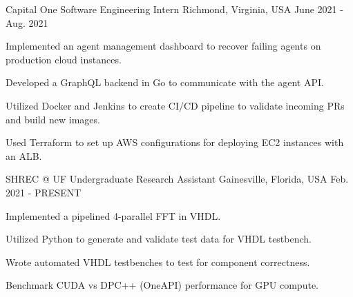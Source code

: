 
\begin{cventries}

  \cventry
    {Capital One} %
    {Software Engineering Intern} %
    {Richmond, Virginia, USA} %
    {June 2021 - Aug. 2021} %
    {
      \begin{cvitems} %
        \item {Implemented an agent management dashboard to recover failing agents on production cloud instances.}
        \item {Developed a GraphQL backend in Go to communicate with the agent API.}
        \item {Utilized Docker and Jenkins to create CI/CD pipeline to validate incoming PRs and build new images.}
        \item {Used Terraform to set up AWS configurations for deploying EC2 instances with an ALB.}
      \end{cvitems}
    }


\cventry
  {SHREC @ UF} %
  {Undergraduate Research Assistant} %
  {Gainesville, Florida, USA} %
  {Feb. 2021 - PRESENT} %
  {
    \begin{cvitems} %
      \item {Implemented a pipelined 4-parallel FFT in VHDL.}
      \item {Utilized Python to generate and validate test data for VHDL testbench.}
      \item {Wrote automated VHDL testbenches to test for component correctness.}
      \item {Benchmark CUDA vs DPC++ (OneAPI) performance for GPU compute.}
    \end{cvitems}
  }



\end{cventries}
